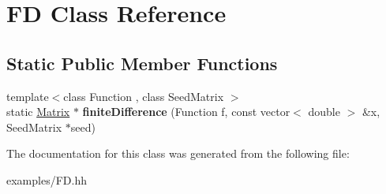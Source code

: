 \hypertarget{classFD}{
\section{FD Class Reference}
\label{classFD}
}
\subsection*{Static Public Member Functions}
\begin{DoxyCompactItemize}
\item 
\hypertarget{classFD_a47fa71e21563e15bbe74055507a6b9ae}{
{\footnotesize template$<$class Function , class SeedMatrix $>$ }\\static \hyperlink{classMatrix}{Matrix} $\ast$ {\bfseries finiteDifference} (Function f, const vector$<$ double $>$ \&x, SeedMatrix $\ast$seed)}
\label{classFD_a47fa71e21563e15bbe74055507a6b9ae}

\end{DoxyCompactItemize}


The documentation for this class was generated from the following file:\begin{DoxyCompactItemize}
\item 
examples/FD.hh\end{DoxyCompactItemize}
